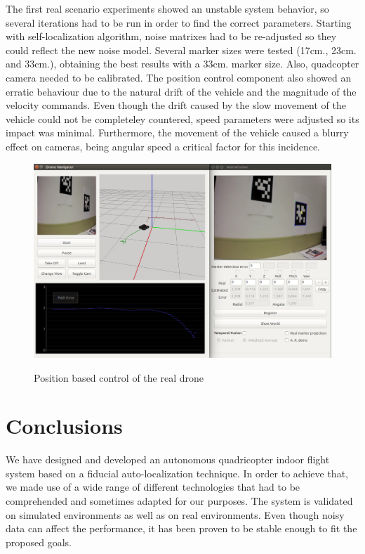 \documentclass{styles/svproc}
\begin{document}
	The first real scenario experiments showed an unstable system behavior, so several iterations had to be run in order to find the correct parameters. Starting with self-localization algorithm, noise matrixes had to be re-adjusted so they could reflect the new noise model. Several marker sizes were tested (17cm., 23cm.  and 33cm.), obtaining the best results with a 33cm. marker size. Also, quadcopter camera needed to be calibrated. The position control component also showed an erratic behaviour due to the natural drift of the vehicle and the magnitude of the velocity commands. Even though the drift caused by the slow movement of the vehicle could not be completeley countered, speed parameters were adjusted so its impact was minimal. Furthermore, the movement of the vehicle caused a blurry effect on cameras, being angular speed a critical factor for this incidence.
	
	\begin{figure}[h!]
		\begin{center}
		{\includegraphics[width=12cm]{appcapture.png}}
		\end{center}
		\caption{Position based control of the real drone}
                \label{fig:realnavigation}
	\end{figure}


\section{Conclusions}

	We have designed and developed an autonomous quadricopter indoor flight system based on a fiducial auto-localization technique. In order to achieve that, we made use of a wide range of different technologies that had to be comprehended and sometimes adapted for our purposes. The system is validated on simulated environments as well as on real environments. Even though noisy data can affect the performance, it has been proven to be stable enough to fit the proposed goals.
	
\end{document}
